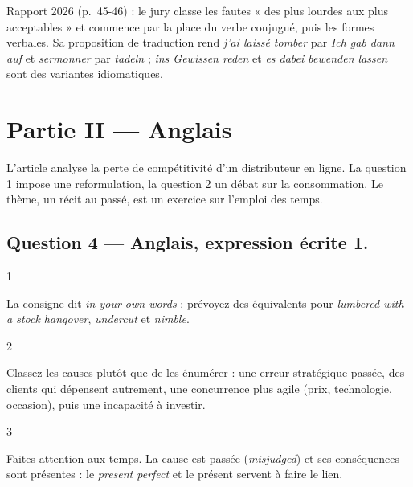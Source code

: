 \documentclass[11pt,a4paper]{article}
\begin{document}
\begin{jury}

Rapport 2026 (p.~45-46) : le jury classe les fautes « des plus lourdes aux plus acceptables » et commence par la place du verbe conjugué, puis les formes verbales. Sa proposition de traduction rend \emph{j'ai laissé tomber} par \emph{Ich gab dann auf} et \emph{sermonner} par \emph{tadeln} ; \emph{ins Gewissen reden} et \emph{es dabei bewenden lassen} sont des variantes idiomatiques.

\end{jury}

\hypertarget{partie-ii-anglais}{%
\section{Partie II --- Anglais}\label{partie-ii-anglais}}

L'article analyse la perte de compétitivité d'un distributeur en ligne. La question 1 impose une reformulation, la question 2 un débat sur la consommation. Le thème, un récit au passé, est un exercice sur l'emploi des temps.

\hypertarget{question-4-anglais-expression-uxe9crite-1.}{%
\subsection{Question 4 --- Anglais, expression écrite 1.}\label{question-4-anglais-expression-uxe9crite-1.}}

\begin{indication}{1}

La consigne dit \emph{in your own words} : prévoyez des équivalents pour \emph{lumbered with a stock hangover}, \emph{undercut} et \emph{nimble}.

\end{indication}

\begin{indication}{2}

Classez les causes plutôt que de les énumérer : une erreur stratégique passée, des clients qui dépensent autrement, une concurrence plus agile (prix, technologie, occasion), puis une incapacité à investir.

\end{indication}

\begin{indication}{3}

Faites attention aux temps. La cause est passée (\emph{misjudged}) et ses conséquences sont présentes : le \emph{present perfect} et le présent servent à faire le lien.

\end{indication}
\end{document}
